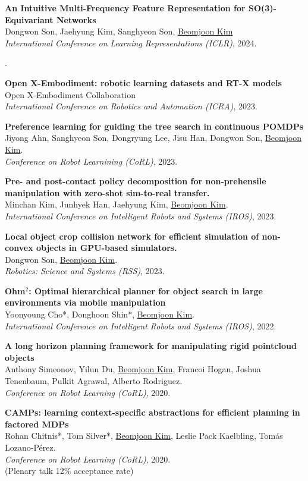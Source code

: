 \documentclass[line,margin,letterpaper]{res}
\begin{document}
\begin{resume}
\textbf{An Intuitive Multi-Frequency Feature Representation for SO(3)-Equivariant Networks }\\
Dongwon Son, Jaehyung Kim, Sanghyeon Son, \underline{Beomjoon Kim} \\
{\sl International Conference on Learning Representations (ICLR)}, 2024.

.

\textbf{Open X-Embodiment: robotic learning datasets and RT-X models}\\
Open X-Embodiment Collaboration \\
{\sl International Conference on Robotics and Automation (ICRA)}, 2023.


\textbf{Preference learning for guiding the tree search in continuous POMDPs
}\\
Jiyong Ahn, Sanghyeon Son, Dongryung Lee, Jisu Han, Dongwon Son, \underline{Beomjoon Kim}. \\
{\sl Conference on Robot Learnining (CoRL)}, 2023.


\textbf{Pre- and post-contact policy decomposition for non-prehensile manipulation with zero-shot sim-to-real transfer.
}\\
Minchan Kim, Junhyek Han, Jaehyung Kim, \underline{Beomjoon Kim}. \\
{\sl International Conference on Intelligent Robots and Systems (IROS)}, 2023.


\textbf{Local object crop collision network for efficient simulation of non-convex objects in GPU-based simulators.
}\\
Dongwon Son, \underline{Beomjoon Kim}. \\
{\sl Robotics: Science and Systems (RSS)}, 2023.

\textbf{Ohm$^2$: Optimal hierarchical planner for object search in large environments via mobile manipulation}\\
Yoonyoung Cho*, Donghoon Shin*, \underline{Beomjoon Kim}. \\
{\sl International Conference on Intelligent Robots and Systems (IROS)}, 2022.

\textbf{A long horizon planning framework for manipulating rigid pointcloud objects}\\
Anthony Simeonov, Yilun Du, \underline{Beomjoon Kim}, Francoi Hogan, Joshua Tenenbaum, Pulkit Agrawal, Alberto Rodriguez.\\
{\sl Conference on Robot Learning (CoRL)}, 2020.

\textbf{CAMPs: learning context-specific abstractions for efficient planning in factored MDPs}\\
Rohan Chitnis*, Tom Silver*, \underline{Beomjoon Kim}, Leslie Pack Kaelbling, Tom\'as Lozano-P\'erez.\\
{\sl Conference on Robot Learning (CoRL)}, 2020.\\
{\small (Plenary talk 12\% acceptance rate)}


\end{resume}
\end{document}
